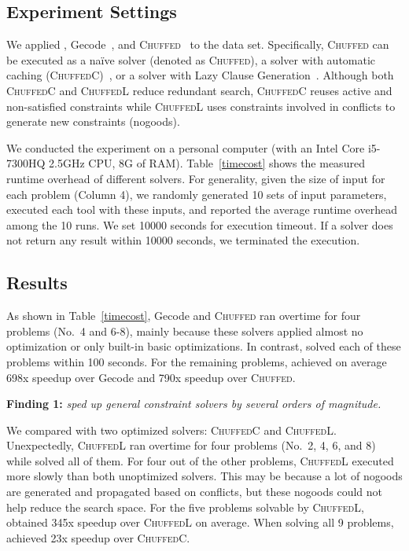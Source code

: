 \subsection{Experiment Settings}\label{sec:setting}

We applied \tool, Gecode~\cite{schulte2006gecode}, and \textsc{Chuffed}~\cite{chu2012exploiting} to the data set. Specifically,
\textsc{Chuffed} can be executed as a na\"ive solver (denoted as \textsc{Chuffed}), a solver with automatic caching (\textsc{ChuffedC})~\cite{Smith2005}, or a solver with Lazy Clause Generation~\cite{ohrimenko2009propagation}. Although both \textsc{ChuffedC} and \textsc{ChuffedL} reduce redundant search, \textsc{ChuffedC} reuses active and non-satisfied constraints while \textsc{ChuffedL} uses constraints involved in conflicts to generate new constraints (nogoods). 

We conducted the experiment 
on a personal computer (with an Intel Core i5-7300HQ 2.5GHz CPU, 8G of RAM). 
Table~\ref{timecost} shows the measured runtime overhead of different solvers. 
For generality, given the size of input for each problem (Column 4), 
we randomly generated 10 sets of input parameters, 
executed each tool with these inputs, and reported the average runtime overhead among the 10 runs.
We set 10000 seconds for execution timeout. If a solver does not return any result within 10000 seconds, we terminated the execution. 

\subsection{Results}\label{sec:results}

As shown in Table~\ref{timecost}, Gecode and \textsc{Chuffed} ran overtime for four problems (No.~4 and 6-8), mainly because these solvers applied 
almost no optimization or only built-in basic optimizations. In contrast, \tool solved each of these problems within 100 seconds. 
For the remaining problems, \tool achieved on average 698x speedup over Gecode and 790x speedup over \textsc{Chuffed}. 

\begin{tcolorbox}
	\textbf{Finding 1:} \emph{
	\tool sped up general constraint solvers by several orders of magnitude. }
\end{tcolorbox}

We compared \tool with two optimized solvers: \textsc{ChuffedC} and \textsc{ChuffedL}. Unexpectedly, \textsc{ChuffedL} ran overtime for four problems (No.~2, 4, 6, and 8) while \tool solved all of them. 
For four out of the other problems, \textsc{ChuffedL} executed more slowly than both unoptimized solvers. This may be because a lot of nogoods are generated and propagated based on conflicts, but these nogoods could not help reduce the search space. 
For the five problems solvable by \textsc{ChuffedL}, 
\tool obtained 345x speedup over \textsc{ChuffedL} on average.
When solving all 9 problems, \tool achieved 23x speedup
over \textsc{ChuffedC}. %

